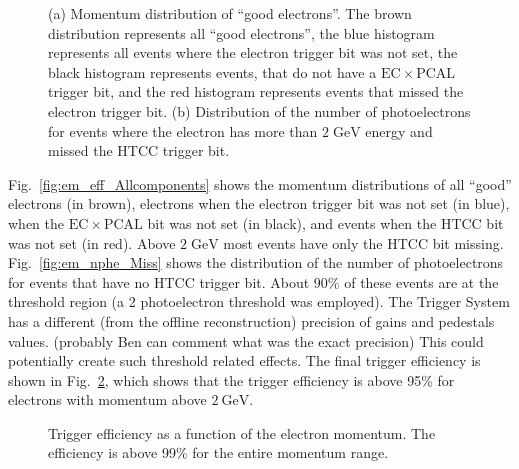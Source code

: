 \begin{figure}[!htb]
 \centering
 \caption{(a) Momentum distribution of ``good electrons''. The brown distribution represents all ``good electrons'', the blue histogram represents all events where the electron trigger bit was not set, the black histogram represents events, that do not have a $\mathrm{EC}\times \mathrm{PCAL}$ trigger bit, and the red histogram represents events that missed the electron trigger bit. (b) Distribution of the number of photoelectrons for events where the electron has more than $\mathrm{2\;GeV}$ energy and missed the HTCC trigger bit.}
 \label{fig:em_missed_events}
\end{figure}

Fig.~\ref{fig:em_eff_Allcomponents} shows the momentum distributions of all ``good'' electrons (in brown), electrons when the electron trigger bit was not set  (in blue), when the $\mathrm{EC}\times \mathrm{PCAL}$ bit was not set (in black), and events when the HTCC bit was not set (in red). Above $\mathrm{2\; GeV}$ most events have only the HTCC bit missing.  Fig.~\ref{fig:em_nphe_Miss} shows the distribution of the number of photoelectrons for events that have no  HTCC trigger bit. About $\mathrm{90\%}$ of these events are at the threshold region (a 2 photoelectron threshold was employed).  The Trigger System has a different (from the offline reconstruction)  precision of gains and pedestals values. ({\color{Red}probably Ben can comment what was the exact precision}) This could potentially create  such threshold related effects. The final trigger efficiency is shown in Fig.~\ref{fig:em_eff}, which shows that  the trigger efficiency is above 95\% for electrons with momentum above $\mathrm{2\ GeV}$.

\begin{figure}[!htb]
 \centering
 \caption{Trigger efficiency as a function of the electron momentum. The efficiency is above 99\% for the entire momentum range.}
 \label{fig:em_eff}
\end{figure}


